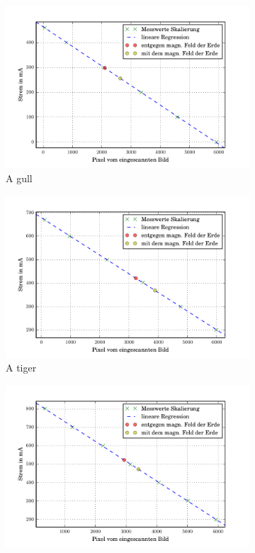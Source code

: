 \begin{figure}
  \centering
  \begin{subfigure}[b]{0.49\textwidth}
     \includegraphics[width=\textwidth]{picture/10MHz.pdf}
     \caption{A gull}
     \label{fig:gull}
  \end{subfigure}
  \begin{subfigure}[b]{0.49\textwidth}
     \includegraphics[width=\textwidth]{picture/15MHz.pdf}
     \caption{A tiger}
     \label{fig:tiger}
  \end{subfigure}
  \begin{subfigure}[b]{0.49\textwidth}
     \includegraphics[width=\textwidth]{picture/20MHz.pdf}

\end{subfigure}
\end{figure}
